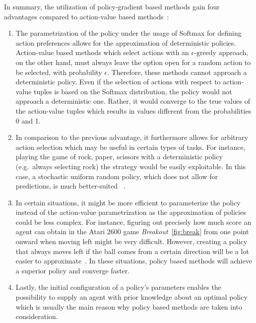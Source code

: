 \documentclass[draft,final]{vutinfth} %
\newcommand{\p}[1]{see p. #1}
\begin{document}
    In summary, the utilization of policy-gradient based methods gain four advantages compared to action-value based methods~\citep[\p{322f}]{sutton_reinforcement_2018}:

    \begin{enumerate}
        \item The parametrization of the policy under the usage of Softmax for defining action preferences allows for the approximation of deterministic policies.
        Action-value based methods which select actions with an $\epsilon\text{-greedy}$ approach, on the other hand, must always leave the option open for a random action to be selected, with probability $\epsilon$.
        Therefore, these methods cannot approach a deterministic policy.
        Even if the selection of actions with respect to action-value tuples is based on the Softmax distribution, the policy would not approach a deterministic one.
        Rather, it would converge to the true values of the action-value tuples which results in values different from the probabilities 0 and 1.
        \item In comparison to the previous advantage, it furthermore allows for arbitrary action selection which may be useful in certain types of tasks.
        For instance, playing the game of rock, paper, scissors with a deterministic policy (e.g.\ always selecting rock) the strategy would be easily exploitable.
        In this case, a stochastic uniform random policy, which does not allow for predictions, is much better-suited ~.
        \item In certain situations, it might be more efficient to parameterize the policy instead of the action-value parametrization as the approximation of policies could be less complex.
        For instance, figuring out precisely how much score an agent can obtain in the Atari 2600 game \textit{Breakout}~\eqref{fig:break} from one point onward when moving left might be very difficult.
        However, creating a policy that always moves left if the ball comes from a certain direction will be a lot easier to approximate~.
        In these situations, policy based methods will achieve a superior policy and converge faster\citep[\p{323}]{sutton_reinforcement_2018}.
        \item Lastly, the initial configuration of a policy's parameters enables the possibility to supply an agent with prior knowledge about an optimal policy which is usually the main reason why policy based methods are taken into consideration.
    \end{enumerate}
\end{document}
